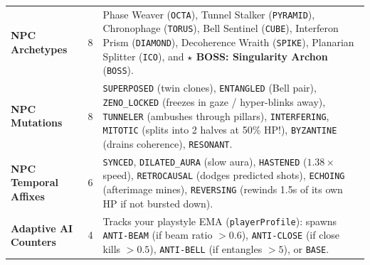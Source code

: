 \documentclass[10pt,letterpaper]{article}
\begin{document}
\begin{table}[ht]
\begin{tabularx}{\textwidth}{@{} L{2.8cm} c Y @{}}
\textbf{NPC Archetypes} & 8 & Phase Weaver (\texttt{OCTA}), Tunnel Stalker (\texttt{PYRAMID}), Chronophage (\texttt{TORUS}), Bell Sentinel (\texttt{CUBE}), Interferon Prism (\texttt{DIAMOND}), Decoherence Wraith (\texttt{SPIKE}), Planarian Splitter (\texttt{ICO}), and \textbf{$\star$ BOSS: Singularity Archon} (\texttt{BOSS}). \\
\textbf{NPC Mutations} & 8 & \texttt{SUPERPOSED} (twin clones), \texttt{ENTANGLED} (Bell pair), \texttt{ZENO\_LOCKED} (freezes in gaze / hyper-blinks away), \texttt{TUNNELER} (ambushes through pillars), \texttt{INTERFERING}, \texttt{MITOTIC} (splits into 2 halves at 50\% HP!), \texttt{BYZANTINE} (drains coherence), \texttt{RESONANT}. \\
\textbf{NPC Temporal Affixes} & 6 & \texttt{SYNCED}, \texttt{DILATED\_AURA} (slow aura), \texttt{HASTENED} ($1.38\times$ speed), \texttt{RETROCAUSAL} (dodges predicted shots), \texttt{ECHOING} (afterimage mines), \texttt{REVERSING} (rewinds 1.5s of its own HP if not bursted down). \\
\textbf{Adaptive AI Counters} & 4 & Tracks your playstyle EMA (\texttt{playerProfile}): spawns \texttt{ANTI-BEAM} (if beam ratio $>0.6$), \texttt{ANTI-CLOSE} (if close kills $>0.5$), \texttt{ANTI-BELL} (if entangles $>5$), or \texttt{BASE}. \\
\bottomrule
\end{tabularx}
\end{table}
\end{document}
